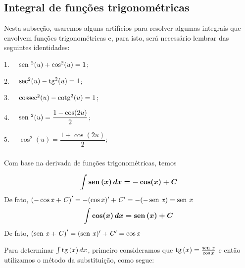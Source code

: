 \cleardoublepage\documentclass[../main.tex]{subfiles}
\begin{document}
\subsection{Integral de funções trigonométricas}\hypertarget{IntTrig}{}
Nesta subseção, usaremos alguns artifícios para resolver algumas integrais que envolvem funções trigonométricas e, para isto, será necessário lembrar das seguintes identidades:
\begin{multicols}{2}
1. \(\quad \operatorname{sen}\,^2(u)+ \cos^2(u)=1 \);

2. \(\quad{\rm sec}^2(u)- {\rm tg} ^2(u)=1 \);

3. \(\quad{\rm cossec}^2(u) - {\rm cotg}^2(u)=1 \);

4. \(\quad\operatorname{sen}\,^2(u) = \dfrac{1- \cos(2u)}{2}\);

5. \(\quad\cos^2(u) = \dfrac{1+ \cos(2u)}{2}\);
\end{multicols}

\subsubsection[\formula{Integrais de  $\sin x, \cos x$ e  $\tg x$}]{}
Com base na derivada de funções trigonométricas, temos

  \begin{equation}
    \boldsymbol{\int \operatorname{sen}\,(x)\,dx = -\cos(x) + C}
  \end{equation}
De fato, $\mathit{\left(-\cos x+C\right)'=-(\cos x)'+C'=-(-\operatorname{sen}\, x)=\operatorname{sen}\, x}$
  \begin{equation}
    \boldsymbol{\int \cos(x)\,dx = \operatorname{sen}\,(x) + C}
  \end{equation}
De fato, $\mathit{\left(\operatorname{sen}\, x+C\right)'=(\operatorname{sen}\, x)'+C'=\cos x}$

Para determinar $ \int \operatorname{tg}\,(x)\,dx$, primeiro consideramos que $\operatorname{tg}\,(x)=\frac{\operatorname{sen}\, x}{\cos x}$ e então utilizamos o método da substituição, como segue:
\end{document}
